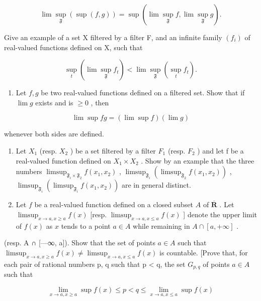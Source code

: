 \[
\lim \sup _ {\mathfrak {F}} (\sup (f, g)) = \sup (\lim \sup _ {\mathfrak {F}} f, \lim \sup _ {\mathfrak {F}} g).
\]

Give an example of a set X filtered by a filter F, and an infinite family \((f_{i})\) of real-valued functions defined on X, such that

\[
\sup _ {t} (\lim \sup _ {\mathfrak {F}} f _ {t}) <   \lim \sup _ {\mathfrak {F}} (\sup _ {t} f _ {t}).
\]

\begin{enumerate}
\def\labelenumi{\arabic{enumi})}
\setcounter{enumi}{4}
\tightlist
\item
  Let \(f, g\) be two real-valued functions defined on a filtered set. Show that if \(\lim g\) exists and is \(\geqslant 0\) , then
\end{enumerate}

\[
\lim \sup f g = (\lim \sup f) (\lim g)
\]

whenever both sides are defined.

\begin{enumerate}
\def\labelenumi{\arabic{enumi})}
\setcounter{enumi}{5}
\item
  Let \(X_{1}\) (resp. \(X_{2}\) ) be a set filtered by a filter \(F_{1}\) (resp. \(F_{2}\) ) and let f be a real-valued function defined on \(X_{1} \times X_{2}\) . Show by an example that the three numbers \(\limsup_{\mathfrak{F}_{i} \times \mathfrak{F}_{2}} f(x_{1}, x_{2})\) , \(\limsup_{\mathfrak{F}_{i}} (\limsup_{\mathfrak{F}_{2}} f(x_{1}, x_{2}))\) , \(\limsup_{\mathfrak{F}_{i}} (\limsup_{\mathfrak{F}_{i}} f(x_{1}, x_{2}))\) are in general distinct.
\item
  Let \(f\) be a real-valued function defined on a closed subset \(A\) of \(\overline{\mathbf{R}}\) . Let \(\limsup_{x \to a, x \geqslant a} f(x)\) {[}resp. \(\limsup_{x \to a, x \leqslant a} f(x)\) {]} denote the upper limit of \(f(x)\) as \(x\) tends to a point \(a \in A\) while remaining in \(A \cap [a, +\infty]\) .
\end{enumerate}


(resp. A ∩ {[}---∞, a{]}). Show that the set of points \(a \in A\) such that \(\limsup_{x \to a, x \geqslant a} f(x) \neq \limsup_{x \to a, x \leqslant a} f(x)\) is countable. {[}Prove that, for each pair of rational numbers p, q such that p \textless{} q, the set \(G_{p,q}\) of points \(a \in A\) such that

\[
\lim _ {x \rightarrow a, x \geqslant a} \sup f (x) \leqslant p <   q \leqslant \lim _ {x \rightarrow a, x \leqslant a} \sup f (x)
\]

